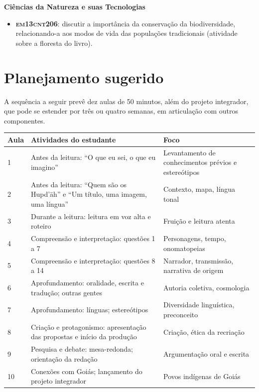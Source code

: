 \textbf{Ciências da Natureza e suas Tecnologias}

\begin{itemize}
\item \textbf{\textsc{em13cnt206}}: discutir a importância da conservação da
biodiversidade, relacionando-a aos modos de vida das populações
tradicionais (atividade sobre a floresta do livro).
\end{itemize}

\chapter{Planejamento sugerido}

\vspace*{-3\baselineskip}

A sequência a seguir prevê dez aulas de 50 minutos, além do projeto
integrador, que pode se estender por três ou quatro semanas, em
articulação com outros componentes.

\begingroup\small
\noindent\begin{tabular}{p{.1\linewidth}p{.42\linewidth}p{.38\linewidth}}
\textbf{Aula} & \textbf{Atividades do estudante} & \textbf{Foco}\\
\hline
1 & Antes da leitura: ``O que eu sei, o que eu imagino'' & Levantamento
de conhecimentos prévios e estereótipos\\
2 & Antes da leitura: ``Quem são os Hupd'äh'' e ``Um título, uma imagem,
uma língua'' & Contexto, mapa, língua tonal\\
3 & Durante a leitura: leitura em voz alta e roteiro & Fruição e leitura
atenta\\
4 & Compreensão e interpretação: questões 1 a 7 & Personagens, tempo,
onomatopeias\\
5 & Compreensão e interpretação: questões 8 a 14 & Narrador,
transmissão, narrativa de origem\\
6 & Aprofundamento: oralidade, escrita e tradução; outras gentes &
Autoria coletiva, cosmologia\\
7 & Aprofundamento: línguas; estereótipos & Diversidade linguística,
preconceito\\
8 & Criação e protagonismo: apresentação das propostas e início da
produção & Criação, ética da recriação\\
9 & Pesquisa e debate: mesa-redonda; orientação da redação &
Argumentação oral e escrita\\
10 & Conexões com Goiás; lançamento do projeto integrador & Povos
indígenas de Goiás\\
\end{tabular}
\endgroup

